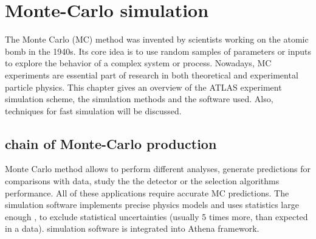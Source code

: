 
\chapter{Monte-Carlo simulation}\label{chap:MC}
The Monte Carlo (MC) method was invented by scientists working on the atomic bomb in the 1940s. Its core idea is to use random samples of parameters or inputs to explore the behavior of a complex system or process.  Nowadays, MC experiments are essential part of research in both theoretical and experimental particle physics.
This chapter gives an overview of the ATLAS experiment simulation scheme, the simulation methods and the software used. Also, techniques for fast simulation will be discussed. 

\section{\atlas chain of Monte-Carlo production}

\begin{figure}[!b]
\end{figure}

Monte Carlo method allows to perform different analyses, generate predictions for comparisons with data, study the the detector or the selection algorithms performance. All of these applications require accurate MC predictions. The simulation software implements precise physics models and uses statistics large enough , to exclude statistical uncertainties (usually 5 times more, than expected in a data). \atlas simulation software is integrated into Athena framework. 

